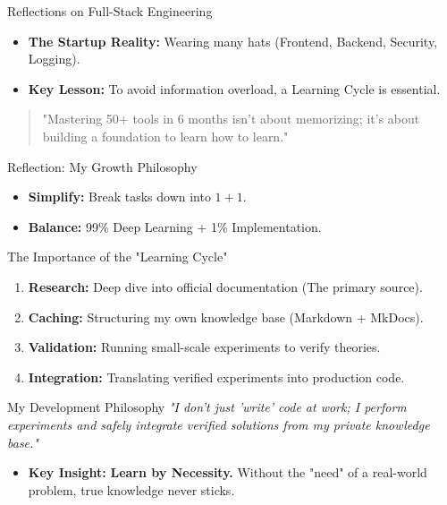 \documentclass[11pt]{beamer}
\begin{document}
\begin{frame}{Reflections on Full-Stack Engineering}
    \begin{itemize}
        \item \textbf{The Startup Reality:} Wearing many hats (Frontend, Backend, Security, Logging).
        \item \textbf{Key Lesson:} To avoid information overload, a Learning Cycle is essential.
    \end{itemize}

    \begin{quote}
        "Mastering 50+ tools in 6 months isn't about memorizing; it's about building a foundation to learn how to learn."
    \end{quote}

    \begin{exampleblock}{Reflection: My Growth Philosophy}
        \begin{itemize}
            \item \textbf{Simplify:} Break tasks down into $1+1$.
            \item \textbf{Balance:} 99\% Deep Learning + 1\% Implementation.
        \end{itemize}
    \end{exampleblock}
\end{frame}

\begin{frame}{The Importance of the "Learning Cycle"}    
    \begin{enumerate}
        \item \textbf{Research:} Deep dive into official documentation (The primary source).
        \item \textbf{Caching:} Structuring my own knowledge base (Markdown + MkDocs).
        \item \textbf{Validation:} Running small-scale experiments to verify theories.
        \item \textbf{Integration:} Translating verified experiments into production code.
    \end{enumerate}

    \begin{exampleblock}{My Development Philosophy}
        \centering
        \textit{"I don't just 'write' code at work; I perform experiments and safely integrate verified solutions from my private knowledge base."}
    \end{exampleblock}

    \vfill
    \begin{itemize}
\item[\ding{43}] \textbf{Key Insight:} \textbf{Learn by Necessity.} Without the "need" of a real-world problem, true knowledge never sticks.    \end{itemize}
\end{frame}
\end{document}
